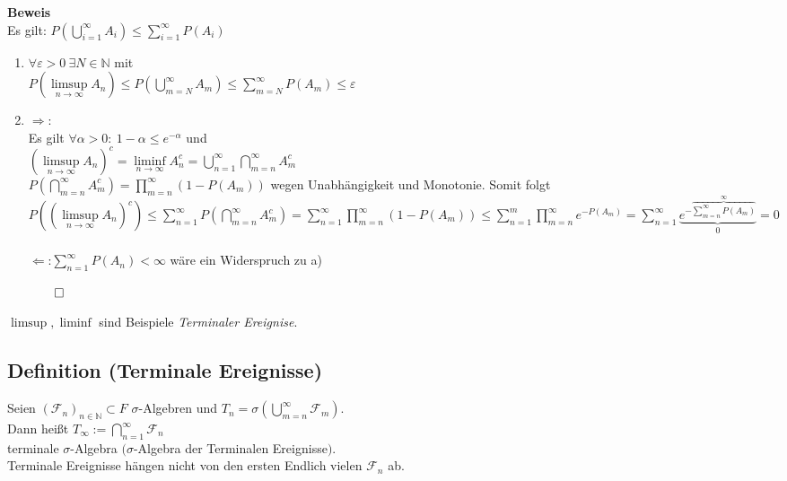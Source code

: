 \documentclass[german,10pt,oneside, fleqn, a4paper]{article}
\newcommand {\N}	{\mathbb{N}}
\newcommand{\QED}{\begin{flushright}$\qed$\end{flushright}}
\newcommand{\mc}[1]{\mathcal{#1}}
\newcommand{\1}[1]{1_{#1}}
\newcommand{\2}[1]{\1{\brac{#1}}}
\newcommand{\f}{\mc{F}}
\begin{document}
\textbf{Beweis}\\
Es gilt: $P \left(\bigcup\limits_{i=1}^\infty A_i\right) \leq \sum\limits_{i=1}^\infty P(A_i)$\begin{enumerate}[label=(\alph*)]
\item $\forall \varepsilon>0\ \exists N\in\N$ mit\\
$P\left(\limsup\limits_{n\rightarrow\infty}A_n\right)\leq P\left(\bigcup\limits_{m=N}^\infty A_m \right) \leq \sum\limits_{m=N}^\infty P(A_m) \leq \varepsilon$
\item \glqq $\Rightarrow$\grqq:\\
Es gilt $\forall\alpha>0:\ 1-\alpha\leq e^{-\alpha}$ und\\
 $\left(\limsup\limits_{n\rightarrow\infty}A_n\right)^c=\liminf\limits_{n\rightarrow\infty}A_n^c=\bigcup\limits_{n=1}^\infty\bigcap\limits_{m=n}^\infty A_m^c$\\
$P\left(\bigcap\limits_{m=n}^\infty A_m^c\right)=\prod\limits_{m=n}^\infty\left(1-P(A_m)\right)$ wegen Unabhängigkeit und Monotonie. Somit folgt\\
$P((\limsup\limits_{n\rightarrow\infty}A_n)^c)
\leq\sum\limits_{n=1}^\infty P\left(\bigcap\limits_{m=n}^\infty A_m^c\right)
=\sum\limits_{n=1}^\infty\prod\limits_{m=n}^\infty (1-P(A_m))
\leq\sum\limits_{n=1}^m\prod\limits_{m=n}^\infty e^{-P(A_m)}
=\sum\limits_{n=1}^\infty \underbrace{e^{-\overbrace{\sum\limits_{m=n}^\infty P(A_m)}^{\infty}}}_{0}=0$\\\\
\glqq $\Leftarrow$\grqq:$\sum\limits_{n=1}^\infty P(A_n)<\infty$ wäre ein Widerspruch zu a)  \QED
\end{enumerate}

$\limsup , \liminf$ sind Beispiele \textit{Terminaler Ereignise}.






\subsection{Definition (Terminale Ereignisse)}
Seien $(\f_n)_{n\in\N}\subset F$ $\sigma$-Algebren und $T_n=\sigma\left(\bigcup\limits_{m=n}^\infty\f_m\right)$. \\
Dann heißt $T_\infty:=\bigcap\limits_{n=1}^\infty\f_n$\\ terminale $\sigma$-Algebra $(\sigma$-Algebra der Terminalen Ereignisse$)$. \\
Terminale Ereignisse hängen nicht von den ersten Endlich vielen $\f_n$ ab.
\end{document}

